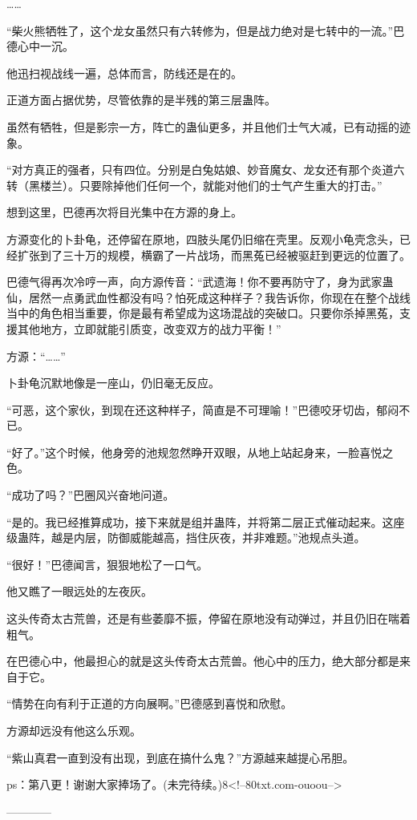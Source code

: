 \begin{this_body}
……

“柴火熊牺牲了，这个龙女虽然只有六转修为，但是战力绝对是七转中的一流。”巴德心中一沉。

他迅扫视战线一遍，总体而言，防线还是在的。

正道方面占据优势，尽管依靠的是半残的第三层蛊阵。

虽然有牺牲，但是影宗一方，阵亡的蛊仙更多，并且他们士气大减，已有动摇的迹象。

“对方真正的强者，只有四位。分别是白兔姑娘、妙音魔女、龙女还有那个炎道六转（黑楼兰）。只要除掉他们任何一个，就能对他们的士气产生重大的打击。”

想到这里，巴德再次将目光集中在方源的身上。

方源变化的卜卦龟，还停留在原地，四肢头尾仍旧缩在壳里。反观小龟壳念头，已经扩张到了三十万的规模，横霸了一片战场，而黑菟已经被驱赶到更远的位置了。

巴德气得再次冷哼一声，向方源传音：“武遗海！你不要再防守了，身为武家蛊仙，居然一点勇武血性都没有吗？怕死成这种样子？我告诉你，你现在在整个战线当中的角色相当重要，你是最有希望成为这场混战的突破口。只要你杀掉黑菟，支援其他地方，立即就能引质变，改变双方的战力平衡！”

方源：“……”

卜卦龟沉默地像是一座山，仍旧毫无反应。

“可恶，这个家伙，到现在还这种样子，简直是不可理喻！”巴德咬牙切齿，郁闷不已。

“好了。”这个时候，他身旁的池规忽然睁开双眼，从地上站起身来，一脸喜悦之色。

“成功了吗？”巴圈风兴奋地问道。

“是的。我已经推算成功，接下来就是组并蛊阵，并将第二层正式催动起来。这座级蛊阵，越是内层，防御威能越高，挡住灰夜，并非难题。”池规点头道。

“很好！”巴德闻言，狠狠地松了一口气。

他又瞧了一眼远处的左夜灰。

这头传奇太古荒兽，还是有些萎靡不振，停留在原地没有动弹过，并且仍旧在喘着粗气。

在巴德心中，他最担心的就是这头传奇太古荒兽。他心中的压力，绝大部分都是来自于它。

“情势在向有利于正道的方向展啊。”巴德感到喜悦和欣慰。

方源却远没有他这么乐观。

“紫山真君一直到没有出现，到底在搞什么鬼？”方源越来越提心吊胆。

ps：第八更！谢谢大家捧场了。(未完待续。)8<!--80txt.com-ouoou-->

------------

\end{this_body}

